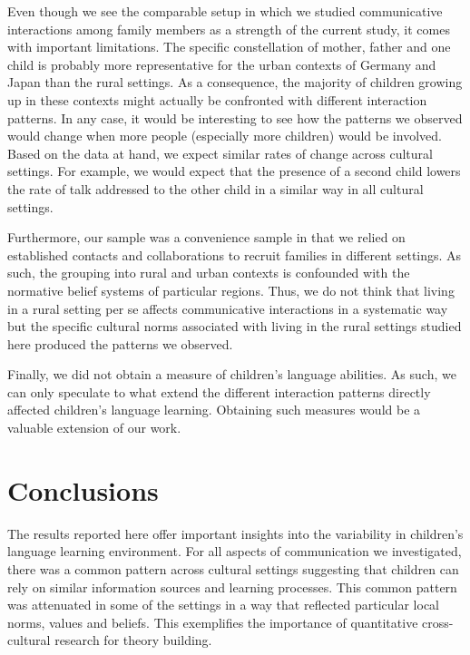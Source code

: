 \documentclass[
  man,floatsintext]{apa6}
\begin{document}
Even though we see the comparable setup in which we studied communicative interactions among family members as a strength of the current study, it comes with important limitations. The specific constellation of mother, father and one child is probably more representative for the urban contexts of Germany and Japan than the rural settings. As a consequence, the majority of children growing up in these contexts might actually be confronted with different interaction patterns. In any case, it would be interesting to see how the patterns we observed would change when more people (especially more children) would be involved. Based on the data at hand, we expect similar rates of change across cultural settings. For example, we would expect that the presence of a second child lowers the rate of talk addressed to the other child in a similar way in all cultural settings.

Furthermore, our sample was a convenience sample in that we relied on established contacts and collaborations to recruit families in different settings. As such, the grouping into rural and urban contexts is confounded with the normative belief systems of particular regions. Thus, we do not think that living in a rural setting per se affects communicative interactions in a systematic way but the specific cultural norms associated with living in the rural settings studied here produced the patterns we observed.

Finally, we did not obtain a measure of children's language abilities. As such, we can only speculate to what extend the different interaction patterns directly affected children's language learning. Obtaining such measures would be a valuable extension of our work.

\hypertarget{conclusions}{%
\section{Conclusions}\label{conclusions}}

The results reported here offer important insights into the variability in children's language learning environment. For all aspects of communication we investigated, there was a common pattern across cultural settings suggesting that children can rely on similar information sources and learning processes. This common pattern was attenuated in some of the settings in a way that reflected particular local norms, values and beliefs. This exemplifies the importance of quantitative cross-cultural research for theory building.
\end{document}
